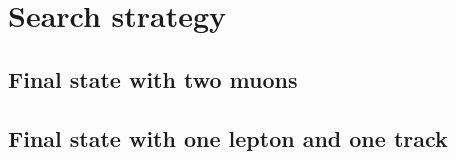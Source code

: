 \clearpage
\section{Search strategy}
\label{sec:search-strategy}

\subsection{Final state with two muons}
\label{sec:dimuon-category}

\subsection{Final state with one lepton and one track}
\label{sec:exclusive-track-category}

